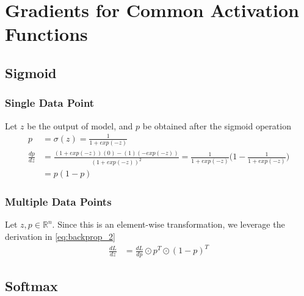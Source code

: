 \documentclass[../../deep_learning_notes.tex]{subfiles}
\begin{document}
\section{Gradients for Common Activation Functions}
\subsection{Sigmoid}
\subsubsection*{Single Data Point}
Let $z$ be the output of model, and $p$ be obtained after the sigmoid operation
\begin{align*}
    p &= \sigma(z) = \frac{1}{1 + exp(-z)}\\
    \frac{dp}{dz} &= \frac{(1 + exp(-z))(0) - (1)(-exp(-z))}{(1 + exp(-z))^{2}} = \frac{1}{1 + exp(-z)} \bigg(1 - \frac{1}{1 + exp(-z)} \bigg)\\
    &= p(1-p)
\end{align*}


\subsubsection*{Multiple Data Points}
Let $z,p \in \mathbb{R}^{n}$. Since this is an element-wise transformation, we leverage the derivation in \eqref{eq:backprop_2} 
\begin{align*}
    \frac{dL}{dz} &= \frac{dL}{dp}\odot p^{T}\odot (1-p)^{T}
\end{align*}

\subsection{Softmax}
\end{document}
